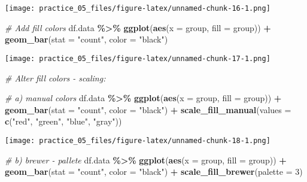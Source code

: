 \documentclass[
]{article}
\newenvironment{Shaded}{\begin{snugshade}}{\end{snugshade}}
\newcommand{\AttributeTok}[1]{\textcolor[rgb]{0.13,0.29,0.53}{#1}}
\newcommand{\CommentTok}[1]{\textcolor[rgb]{0.56,0.35,0.01}{\textit{#1}}}
\newcommand{\DecValTok}[1]{\textcolor[rgb]{0.00,0.00,0.81}{#1}}
\newcommand{\FunctionTok}[1]{\textcolor[rgb]{0.13,0.29,0.53}{\textbf{#1}}}
\newcommand{\NormalTok}[1]{#1}
\newcommand{\SpecialCharTok}[1]{\textcolor[rgb]{0.81,0.36,0.00}{\textbf{#1}}}
\newcommand{\StringTok}[1]{\textcolor[rgb]{0.31,0.60,0.02}{#1}}
\begin{document}
\texttt{[image: practice\_05\_files/figure-latex/unnamed-chunk-16-1.png]}

\begin{Shaded}
\begin{Highlighting}[]
\CommentTok{\# Add fill colors}
\NormalTok{df.data }\SpecialCharTok{\%\textgreater{}\%} 
  \FunctionTok{ggplot}\NormalTok{(}\FunctionTok{aes}\NormalTok{(}\AttributeTok{x =}\NormalTok{ group,}
             \AttributeTok{fill =}\NormalTok{ group)) }\SpecialCharTok{+}
  \FunctionTok{geom\_bar}\NormalTok{(}\AttributeTok{stat =} \StringTok{"count"}\NormalTok{,}
           \AttributeTok{color =} \StringTok{"black"}\NormalTok{)}
\end{Highlighting}
\end{Shaded}

\texttt{[image: practice\_05\_files/figure-latex/unnamed-chunk-17-1.png]}

\begin{Shaded}
\begin{Highlighting}[]
\CommentTok{\# Alter fill colors {-} scaling:}

\CommentTok{\# a) manual colors}
\NormalTok{df.data }\SpecialCharTok{\%\textgreater{}\%} 
  \FunctionTok{ggplot}\NormalTok{(}\FunctionTok{aes}\NormalTok{(}\AttributeTok{x =}\NormalTok{ group,}
             \AttributeTok{fill =}\NormalTok{ group)) }\SpecialCharTok{+}
  \FunctionTok{geom\_bar}\NormalTok{(}\AttributeTok{stat =} \StringTok{"count"}\NormalTok{,}
           \AttributeTok{color =} \StringTok{"black"}\NormalTok{) }\SpecialCharTok{+}
  \FunctionTok{scale\_fill\_manual}\NormalTok{(}\AttributeTok{values =} \FunctionTok{c}\NormalTok{(}\StringTok{"red"}\NormalTok{, }\StringTok{"green"}\NormalTok{, }\StringTok{"blue"}\NormalTok{, }\StringTok{"gray"}\NormalTok{))}
\end{Highlighting}
\end{Shaded}

\texttt{[image: practice\_05\_files/figure-latex/unnamed-chunk-18-1.png]}

\begin{Shaded}
\begin{Highlighting}[]
\CommentTok{\# b) brewer {-} pallete}
\NormalTok{df.data }\SpecialCharTok{\%\textgreater{}\%} 
  \FunctionTok{ggplot}\NormalTok{(}\FunctionTok{aes}\NormalTok{(}\AttributeTok{x =}\NormalTok{ group,}
             \AttributeTok{fill =}\NormalTok{ group)) }\SpecialCharTok{+}
  \FunctionTok{geom\_bar}\NormalTok{(}\AttributeTok{stat =} \StringTok{"count"}\NormalTok{,}
           \AttributeTok{color =} \StringTok{"black"}\NormalTok{) }\SpecialCharTok{+}
  \FunctionTok{scale\_fill\_brewer}\NormalTok{(}\AttributeTok{palette =} \DecValTok{3}\NormalTok{)}
\end{Highlighting}
\end{Shaded}
\end{document}
